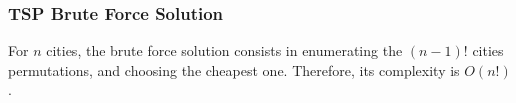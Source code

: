 \documentclass{beamer}
\begin{document}
\begin{frame}%
\frametitle{TSP Brute Force Solution}

\footnotesize

For $n$ cities, the brute force solution consists in enumerating the $(n - 1)!$ cities
permutations, and choosing the cheapest one. Therefore, its complexity is $O(n!)$.



\end{frame}
\end{document}
